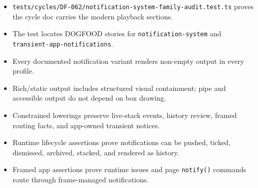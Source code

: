 \begin{itemize}
\tightlist
\item
  \texttt{t\allowbreak{}e\allowbreak{}s\allowbreak{}t\allowbreak{}s\allowbreak{}/\allowbreak{}c\allowbreak{}y\allowbreak{}c\allowbreak{}l\allowbreak{}e\allowbreak{}s\allowbreak{}/\allowbreak{}D\allowbreak{}F\allowbreak{}-\allowbreak{}0\allowbreak{}6\allowbreak{}2\allowbreak{}/\allowbreak{}n\allowbreak{}o\allowbreak{}t\allowbreak{}i\allowbreak{}f\allowbreak{}i\allowbreak{}c\allowbreak{}a\allowbreak{}t\allowbreak{}i\allowbreak{}o\allowbreak{}n\allowbreak{}-\allowbreak{}s\allowbreak{}y\allowbreak{}s\allowbreak{}t\allowbreak{}e\allowbreak{}m\allowbreak{}-\allowbreak{}f\allowbreak{}a\allowbreak{}m\allowbreak{}i\allowbreak{}l\allowbreak{}y\allowbreak{}-\allowbreak{}a\allowbreak{}u\allowbreak{}d\allowbreak{}i\allowbreak{}t\allowbreak{}.\allowbreak{}t\allowbreak{}e\allowbreak{}s\allowbreak{}t\allowbreak{}.\allowbreak{}t\allowbreak{}s} proves the cycle doc carries the modern playback sections.
\item
  The test locates DOGFOOD stories for \texttt{n\allowbreak{}o\allowbreak{}t\allowbreak{}i\allowbreak{}f\allowbreak{}i\allowbreak{}c\allowbreak{}a\allowbreak{}t\allowbreak{}i\allowbreak{}o\allowbreak{}n\allowbreak{}-\allowbreak{}s\allowbreak{}y\allowbreak{}s\allowbreak{}t\allowbreak{}e\allowbreak{}m} and \texttt{t\allowbreak{}r\allowbreak{}a\allowbreak{}n\allowbreak{}s\allowbreak{}i\allowbreak{}e\allowbreak{}n\allowbreak{}t\allowbreak{}-\allowbreak{}a\allowbreak{}p\allowbreak{}p\allowbreak{}-\allowbreak{}n\allowbreak{}o\allowbreak{}t\allowbreak{}i\allowbreak{}f\allowbreak{}i\allowbreak{}c\allowbreak{}a\allowbreak{}t\allowbreak{}i\allowbreak{}o\allowbreak{}n\allowbreak{}s}.
\item
  Every documented notification variant renders non-empty output in every profile.
\item
  Rich/static output includes structured visual containment; pipe and accessible output do not depend on box drawing.
\item
  Constrained lowerings preserve live-stack events, history review, framed routing facts, and app-owned transient notices.
\item
  Runtime lifecycle assertions prove notifications can be pushed, ticked, dismissed, archived, stacked, and rendered as history.
\item
  Framed app assertions prove runtime issues and page \texttt{n\allowbreak{}o\allowbreak{}t\allowbreak{}i\allowbreak{}f\allowbreak{}y\allowbreak{}(\allowbreak{})} commands route through frame-managed notifications.
\end{itemize}


